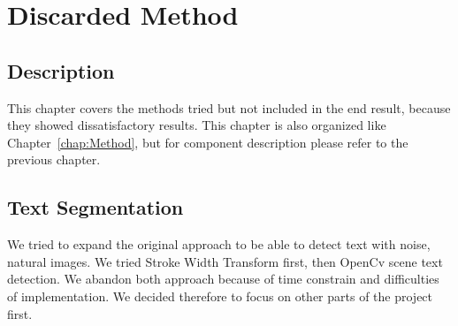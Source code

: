 \documentclass[Report.tex]{subfiles}
\begin{document}
\chapter{Discarded Method}
\label{chap:Discarded Method}
\section{Description}
This chapter covers the methods tried but not included in the end result, because they showed dissatisfactory results. This chapter is also organized like Chapter~\ref{chap:Method}, but for component description please refer to the previous chapter.

\section{Text Segmentation}
We tried to expand the original approach to be able to detect text with noise, natural images. We tried Stroke Width Transform first, then OpenCv scene text detection. We abandon both approach because of time constrain and difficulties of implementation. We decided therefore to focus on other parts of the project first.
\end{document}
